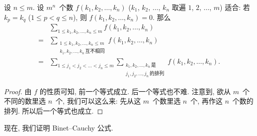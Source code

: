 \documentclass[%
    UTF8,%
    fontset=none,%
    punct=kaiming,%
    zihao=-4,%
    a4paper,%
    oneside,%
]{ctexbook}
\let\emph\relax
\renewcommand*{\leq}{\leqslant}
\begin{document}
\begin{theorem}
    设 \(n \leq m\).
    设 \(m^n\)~个数 \(f(k_1, k_2, \dots, k_n)\)
    (\(k_1\), \(k_2\), \(\dots\), \(k_n\) 取遍
    \(1\), \(2\), \(\dots\), \(m\))
    适合:
    若 \(k_p = k_q\) (\(1 \leq p < q \leq n\)),
    则 \(f(k_1, k_2, \dots, k_n) = 0\).
    那么
    \begin{align*}
             &
        \sum_{1 \leq k_1, k_2, \dots, k_n \leq m}
        {f(k_1, k_2, \dots, k_n)}
        \\
        = {} &
        \sum_{\substack{
        1 \leq k_1, k_2, \dots, k_n \leq m \\
                k_1, k_2, \dots, k_n\,\text{互不相同}
            }}
        {f(k_1, k_2, \dots, k_n)}
        \\
        = {} &
        \sum_{1 \leq j_1 < j_2 < \dots < j_n \leq m}
        {\sum_{\substack{
        k_1, k_2, \dots, k_n\,\text{是}     \\
                    j_1, j_2, \dots, j_n\,\text{的排列}
                }}
            {f(k_1, k_2, \dots, k_n)}}.
    \end{align*}
\end{theorem}

\begin{proof}
    由 \(f\) 的性质可知, 前一个等式成立.
    后一个等式也不难.
    注意到,
    欲从 \(m\)~个不同的数里\emph{有次序地}选 \(n\)~个,
    我们可以这么来:
    先\emph{无次序地}从这 \(m\)~个数里选 \(n\)~个,
    再作这 \(n\)~个数的排列.
    所以后一个等式也成立.
\end{proof}

现在, 我们证明 Binet--Cauchy 公式.
\end{document}
